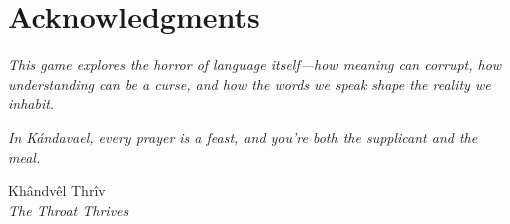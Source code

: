 \documentclass[11pt,a4paper,twoside]{book}
\begin{document}
\backmatter

\chapter*{Acknowledgments}

\textit{This game explores the horror of language itself—how meaning can corrupt, how understanding can be a curse, and how the words we speak shape the reality we inhabit.}

\vspace{1em}

\textit{In Kándavael, every prayer is a feast, and you're both the supplicant and the meal.}

\vspace{2em}

\begin{center}
\Huge\runefont
Khândvêl Thrîv\\
\normalsize
\vspace{0.5em}
\textit{The Throat Thrives}
\end{center}
\end{document}
